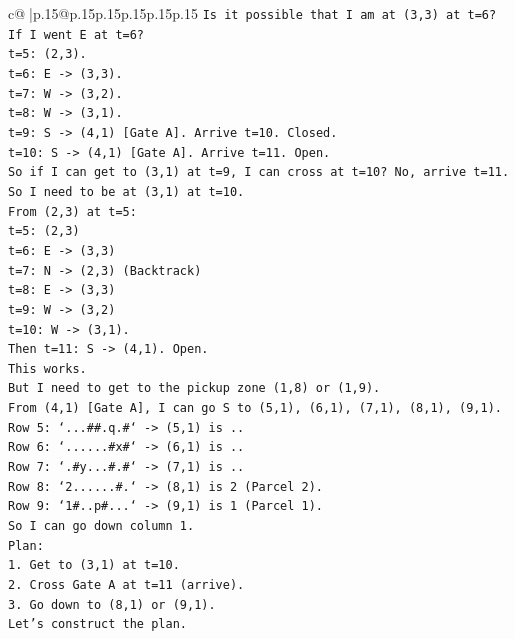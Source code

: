 \documentclass{article}
\begin{document}
{\begin{supertabular}{c@{$\;$}|p{.15\linewidth}@{}p{.15\linewidth}p{.15\linewidth}p{.15\linewidth}p{.15\linewidth}p{.15\linewidth}}
{{{\texttt{Is it possible that I am at (3,3) at t=6?} \\
\texttt{If I went E at t=6?} \\
\texttt{t=5: (2,3).} \\
\texttt{t=6: E {-}> (3,3).} \\
\texttt{t=7: W {-}> (3,2).} \\
\texttt{t=8: W {-}> (3,1).} \\
\texttt{t=9: S {-}> (4,1) {[}Gate A{]}. Arrive t=10. Closed.} \\
\texttt{t=10: S {-}> (4,1) {[}Gate A{]}. Arrive t=11. Open.} \\
\texttt{So if I can get to (3,1) at t=9, I can cross at t=10? No, arrive t=11.} \\
\texttt{So I need to be at (3,1) at t=10.} \\
\texttt{From (2,3) at t=5:} \\
\texttt{t=5: (2,3)} \\
\texttt{t=6: E {-}> (3,3)} \\
\texttt{t=7: N {-}> (2,3) (Backtrack)} \\
\texttt{t=8: E {-}> (3,3)} \\
\texttt{t=9: W {-}> (3,2)} \\
\texttt{t=10: W {-}> (3,1).} \\
\texttt{Then t=11: S {-}> (4,1). Open.} \\
\texttt{This works.} \\
\texttt{But I need to get to the pickup zone (1,8) or (1,9).} \\
\texttt{From (4,1) {[}Gate A{]}, I can go S to (5,1), (6,1), (7,1), (8,1), (9,1).} \\
\texttt{Row 5: `...\#\#.q.\#` {-}> (5,1) is ..} \\
\texttt{Row 6: `......\#x\#` {-}> (6,1) is ..} \\
\texttt{Row 7: `.\#y...\#.\#` {-}> (7,1) is ..} \\
\texttt{Row 8: `2......\#.` {-}> (8,1) is 2 (Parcel 2).} \\
\texttt{Row 9: `1\#..p\#...` {-}> (9,1) is 1 (Parcel 1).} \\
\texttt{So I can go down column 1.} \\
\texttt{Plan:} \\
\texttt{1. Get to (3,1) at t=10.} \\
\texttt{2. Cross Gate A at t=11 (arrive).} \\
\texttt{3. Go down to (8,1) or (9,1).} \\
\texttt{Let's construct the plan.} \\
}}}
\end{supertabular}}
\end{document}
